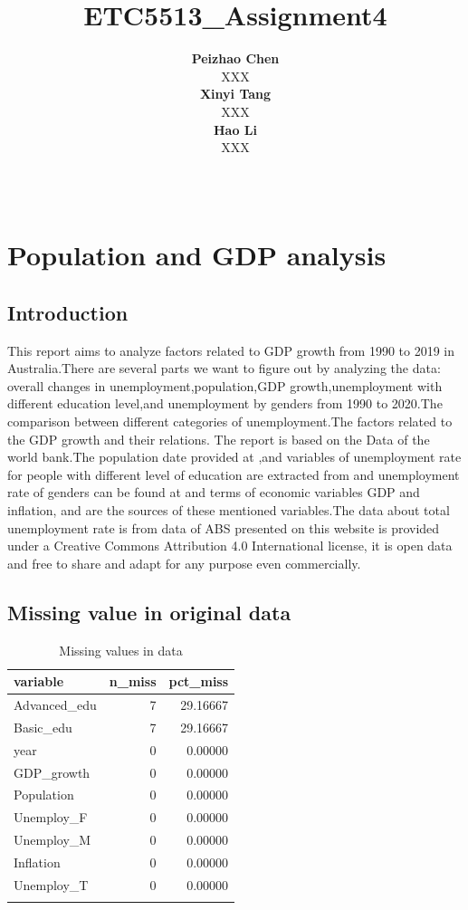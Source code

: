 \documentclass[11pt,a4paper,]{article}
\title{ETC5513\_Assignment4}
\author{\sf\Large\textbf{ Peizhao Chen}\\ {\sf\large XXX\\[0.5cm]} \sf\Large\textbf{ Xinyi Tang}\\ {\sf\large XXX\\[0.5cm]} \sf\Large\textbf{ Hao Li}\\ {\sf\large XXX\\[0.5cm]}}
\date{\sf\Date~\Month~\Year}
\makeatletter
\def\titlepage{\front{\expandafter{\@title}}{\@author}{\@organization}}
\makeatother
\begin{document}
\titlepage

\section{Population and GDP analysis}

\subsection{Introduction}

This report aims to analyze factors related to GDP growth from 1990 to 2019 in Australia.There are several parts we want to figure out by analyzing the data: overall changes in unemployment,population,GDP growth,unemployment with different education level,and unemployment by genders from 1990 to 2020.The comparison between different categories of unemployment.The factors related to the GDP growth and their relations.
The report is based on the Data of the world bank.The population date provided at \textcite{Population},and variables of unemployment rate for people with different level of education are extracted from \textcite{basiceducation} and \textcite{advancededucation.Similarly} unemployment rate of genders can be found at \textcite{femaleunemployment} and \textcite{maleunemploymen.In} terms of economic variables GDP and inflation,\textcite{GDP} and \textcite{inflation} are the sources of these mentioned variables.The data about total unemployment rate is from \textcite{totalunemployment.All} data of ABS presented on this website is provided under a Creative Commons Attribution 4.0 International license, it is open data and free to share and adapt for any purpose even commercially.

\subsection{Missing value in original data}

\begin{table}[H]

\caption{\label{tab:m1}Missing values in data}
\centering
\begin{tabular}[t]{lrr}
\toprule{}
variable & n\_miss & pct\_miss\\
\midrule{}
Advanced\_edu & 7 & 29.16667\\
Basic\_edu & 7 & 29.16667\\
year & 0 & 0.00000\\
GDP\_growth & 0 & 0.00000\\
Population & 0 & 0.00000\\
\addlinespace
Unemploy\_F & 0 & 0.00000\\
Unemploy\_M & 0 & 0.00000\\
Inflation & 0 & 0.00000\\
Unemploy\_T & 0 & 0.00000\\
\bottomrule{}
\end{tabular}
\end{table}
\end{document}
